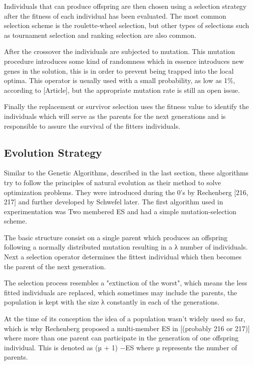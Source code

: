 Individuals that can produce offspring are then chosen using a selection strategy after the fitness of each individual has been evaluated. The most common selection scheme is the roulette-wheel selection, but other types of selections such as tournament selection and ranking selection are also common. 

After the crossover the individuals are subjected to mutation. This mutation procedure introduces some kind of randomness which in essence introduces new genes in the solution, this is in order to prevent being trapped into the local optima. This operator is usually used with a small probability, as low as 1\%, according to [Article], but the appropriate mutation rate is still an open issue.

Finally the replacement or survivor selection uses the fitness value to identify the individuals which will serve as the parents for the next generations and is responsible to assure the survival of the fitters individuals.

\subsection{Evolution Strategy}

Similar to the Genetic Algorithms, described in the last section, these algorithms try to follow the principles of natural evolution as their method to solve optimization problems. They were introduced during the 0's by Rechenberg [216, 217] and further developed by Schwefel later. The first algorithm used in experimentation was Two membered ES and had a simple mutation-selection scheme.

The basic structure consist on a single parent which produces an offspring following a normally distributed mutation resulting in a λ number of individuals. Next a selection operator determines the fittest individual which then becomes the parent of the next generation.

The selection process resembles a "extinction of the worst", which means the less fitted individuals are replaced, which sometimes may include the parents, the population is kept with the size λ constantly in each of the generations.

At the time of its conception the idea of a population wasn't widely used so far, which is why Rechenberg proposed a multi-member ES in [(probably 216 or 217)] where more than one parent can participate in the generation of one offspring individual. This is denoted as (µ + 1) −ES where µ represents the number of parents. 

